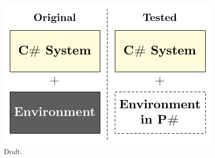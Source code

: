 \begin{figure}[t]
\centering
\includegraphics[width=\linewidth]{img/models_new}
\caption{Draft.}
\label{fig:newapproach}
\end{figure}

